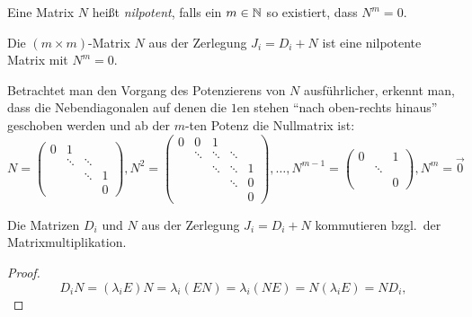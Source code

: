 \begin{definition}[Wiederholung]
    Eine Matrix $N$ heißt \emph{nilpotent}, falls ein $m \in \mathbb{N}$ so existiert, dass $N^m = 0$.
\end{definition}

\begin{corollary}
    Die $(m \times m)$-Matrix $N$ aus der Zerlegung $J_i = D_i + N$ ist eine nilpotente Matrix mit $N^m = 0$.
\end{corollary}

Betrachtet man den Vorgang des Potenzierens von $N$ ausführlicher, erkennt man,
dass die Nebendiagonalen auf denen die $1$en stehen \enquote{nach oben-rechts hinaus} geschoben werden und ab der $m$-ten Potenz die Nullmatrix ist:
\begin{equation*}
    N = \begin{pmatrix}
             0 & 1      &        & \\
               & \ddots & \ddots & \\
               &        & \ddots & 1\\
               &        &        & 0
         \end{pmatrix},
    N^2 = \begin{pmatrix}
               0 & 0      & 1      &        & \\
                 & \ddots & \ddots & \ddots & \\
                 &        & \ddots & \ddots & 1\\
                 &        &        & \ddots & 0\\
                 &        &        &        & 0
           \end{pmatrix},
    \dots,
    N^{m-1} = \begin{pmatrix}
                   0 &        & 1\\
                     & \ddots & \\
                     &        & 0
              \end{pmatrix},
    N^m = \vec{0}
\end{equation*}

\begin{lemma}
    Die Matrizen $D_i$ und $N$ aus der Zerlegung $J_i = D_i + N$ kommutieren bzgl.\ der Matrixmultiplikation.
\end{lemma}

\begin{proof}
    \begin{equation*}
        D_i N = (\lambda_i E) N = \lambda_i (EN) = \lambda_i (NE) = N (\lambda_i E) = N D_i,
    \end{equation*}
\end{proof}

